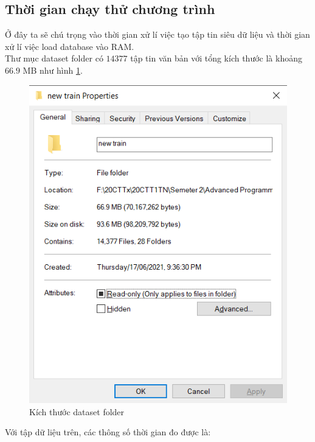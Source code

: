 \documentclass[12pt,a4paper]{article}
\begin{document}
\subsection{Thời gian chạy thử chương trình}
Ở đây ta sẽ chú trọng vào thời gian xử lí việc tạo tập tin siêu dữ liệu và thời gian xử lí việc load database vào RAM.\\
Thư mục dataset folder có \(14377\) tập tin văn bản với tổng kích thước là khoảng \(66.9\) MB như hình \ref{Fig29}.
\begin{figure}[H]
\begin{center}
\includegraphics[scale=1]{Fig29}
\end{center}
\caption{Kích thước dataset folder}
\label{Fig29}
\end{figure}
Với tập dữ liệu trên, các thông số thời gian đo được là:
\end{document}
